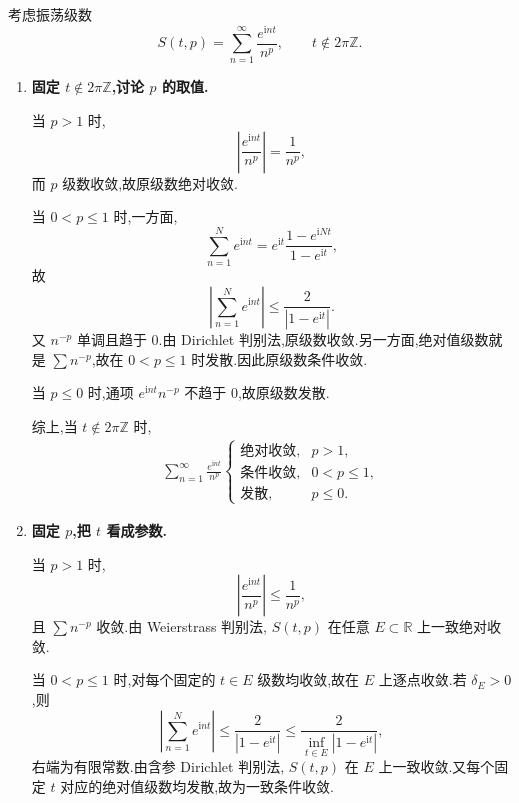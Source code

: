 \begin{example}
	考虑振荡级数
	\begin{equation*}
		S(t,p)=\sum_{n=1}^{\infty}\frac{e^{\mathrm{i}nt}}{n^p},
		\qquad t\notin2\pi\mathbb Z.
	\end{equation*}

	\begin{enumerate}
		\item \textbf{固定 $t\notin2\pi\mathbb Z$,讨论 $p$ 的取值.}

		当 $p>1$ 时,
		\begin{equation*}
			\left|\frac{e^{\mathrm{i}nt}}{n^p}\right|=\frac1{n^p},
		\end{equation*}
		而 $p$ 级数收敛,故原级数绝对收敛.

		当 $0<p\leq1$ 时,一方面,
		\begin{equation*}
			\sum_{n=1}^N e^{\mathrm{i}nt}
			=
			e^{\mathrm{i}t}\frac{1-e^{\mathrm{i}Nt}}{1-e^{\mathrm{i}t}},
		\end{equation*}
		故
		\begin{equation*}
			\left|\sum_{n=1}^N e^{\mathrm{i}nt}\right|
			\leq \frac{2}{|1-e^{\mathrm{i}t}|}.
		\end{equation*}
		又 $n^{-p}$ 单调且趋于 $0$.由 Dirichlet 判别法,原级数收敛.另一方面,绝对值级数就是 $\sum n^{-p}$,故在 $0<p\leq1$ 时发散.因此原级数条件收敛.

		当 $p\leq0$ 时,通项 $e^{\mathrm{i}nt}n^{-p}$ 不趋于 $0$,故原级数发散.

		综上,当 $t\notin2\pi\mathbb Z$ 时,
		\begin{gather*}
			\sum_{n=1}^{\infty}\frac{e^{\mathrm{i}nt}}{n^p}
			\begin{cases}
				\text{绝对收敛},&p>1,\\[3pt]
				\text{条件收敛},&0<p\leq1,\\[3pt]
				\text{发散},&p\leq0.
			\end{cases}
		\end{gather*}

		\item \textbf{固定 $p$,把 $t$ 看成参数.}

		当 $p>1$ 时,
		\begin{equation*}
			\left|\frac{e^{\mathrm{i}nt}}{n^p}\right|\leq \frac1{n^p},
		\end{equation*}
		且 $\sum n^{-p}$ 收敛.由 Weierstrass 判别法, $S(t,p)$ 在任意 $E\subset\mathbb R$ 上一致绝对收敛.

		当 $0<p\leq1$ 时,对每个固定的 $t\in E$ 级数均收敛,故在 $E$ 上逐点收敛.若 $\delta_E>0$,则
		\begin{equation*}
			\left|\sum_{n=1}^N e^{\mathrm{i}nt}\right|
			\leq \frac{2}{|1-e^{\mathrm{i}t}|}
			\leq \frac{2}{\inf_{t\in E}|1-e^{\mathrm{i}t}|},
		\end{equation*}
		右端为有限常数.由含参 Dirichlet 判别法, $S(t,p)$ 在 $E$ 上一致收敛.又每个固定 $t$ 对应的绝对值级数均发散,故为一致条件收敛.


\end{enumerate}
\end{example}
